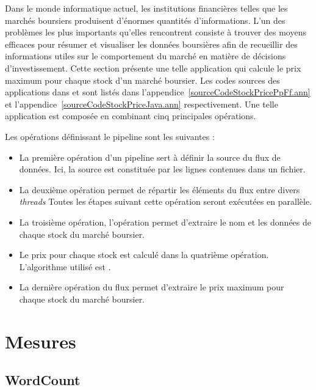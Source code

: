 Dans le monde informatique actuel, les institutions financi\`eres telles que les march\'es boursiers produisent d'\'enormes quantit\'es d'informations. L'un des probl\`emes les plus importants qu'elles rencontrent consiste \`a trouver des moyens efficaces pour r\'esumer et visualiser les donn\'ees boursi\`eres afin de recueillir des informations utiles sur le comportement du march\'e en matière de d\'ecisions d'investissement. Cette section pr\'esente une telle application qui calcule le prix maximum pour chaque stock d'un marché boursier. Les codes sources des applications  dans  et  sont list\'es dans l'appendice~\ref{sourceCodeStockPricePpFf.ann} et l'appendice~\ref{sourceCodeStockPriceJava.ann} respectivement. Une telle application est compos\'ee en combinant cinq principales op\'erations.

Les op\'erations d\'efinissant le pipeline sont les suivantes :

\begin{itemize}

\item La premi\`ere op\'eration d'un pipeline sert \`a d\'efinir la source du flux de donn\'ees. Ici, la source est constitu\'ee par les lignes contenues dans un fichier.

\item La deuxi\`eme op\'eration permet de r\'epartir les \'el\'ements du flux entre divers \emph{threads}
Toutes les \'etapes suivant cette op\'eration seront ex\'ecut\'ees en parall\`ele.

\item La troisi\`eme op\'eration, l'op\'eration  permet d'extraire le nom et les donn\'ees de chaque stock du march\'e boursier.

\item Le prix pour chaque stock est calcul\'e dans la quatri\`eme op\'eration. L'algorithme utilis\'e est .

\item La derni\`ere op\'eration du flux permet d'extraire le prix maximum pour chaque stock du march\'e boursier.


\end{itemize}


\section{Mesures}


\subsection{WordCount}

